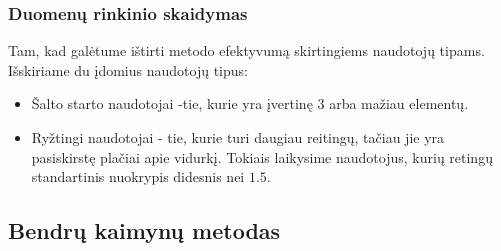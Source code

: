 \documentclass{VUMIFInfMagistrinis}
\begin{document}
\subsubsection{Duomenų rinkinio skaidymas}
\indent
Tam, kad galėtume ištirti metodo efektyvumą skirtingiems naudotojų tipams. Išskiriame du įdomius naudotojų tipus:
\begin{itemize}
	\item Šalto starto naudotojai -tie, kurie yra įvertinę 3 arba mažiau elementų.
	\item Ryžtingi naudotojai - tie, kurie turi daugiau reitingų, tačiau jie yra pasiskirstę plačiai apie vidurkį. Tokiais laikysime naudotojus, kurių retingų standartinis nuokrypis didesnis nei $1.5$.
\end{itemize} 


\subsection{Bendrų kaimynų metodas}
\end{document}
